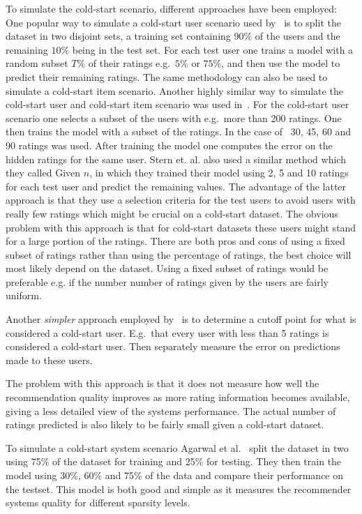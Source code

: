 To simulate the cold-start scenario, different approaches have been employed:
One popular way to simulate a cold-start user scenario used by~\cite{Stern2009,
Lam2008} is to split the dataset in two disjoint sets, a training set
containing $90\%$ of the users and the remaining $10\%$ being in the test set. For
each test user one trains a model with a random subset $T\%$ of their ratings
e.g.\ $5\%$ or $75\%$, and then use the model to predict their remaining
ratings. The same methodology can also be used to simulate a cold-start item
scenario. Another highly similar way to simulate the cold-start user and
cold-start item scenario was used in~\cite{Rashid2002, Rashid2008}. For the
cold-start user scenario one selects a subset of the users with e.g.\ more than
200 ratings. One then trains the model with a subset of the ratings. In the
case of~\cite{Rashid2002} 30, 45, 60 and 90 ratings was used. After training
the model one computes the error on the hidden ratings for the same user.
Stern et. al. \cite{Stern1998} also used a similar method which they called
Given $n$, in which they trained their model using 2, 5 and 10 ratings for each
test user and predict the remaining values.
The advantage of the latter approach is that they use a selection criteria for
the test users to avoid users with really few ratings which might be crucial on
a cold-start dataset. The obvious problem with this approach is that for
cold-start datasets these users might stand for a large portion of the ratings.
There are both pros and cons of using a fixed subset of ratings rather than
using the percentage of ratings, the best choice will most likely depend on the
dataset. Using a fixed subset of ratings would be preferable e.g. if the number
number of ratings given by the users are fairly uniform.

Another \emph{simpler} approach employed by~\cite{Massa2007, Jamali2009} is to
determine a cutoff point for what is considered a cold-start user. E.g.\ that
every user with less than 5 ratings is considered a cold-start user. Then
separately measure the error on predictions made to these users.

The problem with this approach is that it does not measure how well the
recommendation quality improves as more rating information becomes available,
giving a less detailed view of the systems performance. The actual number of
ratings predicted is also likely to be fairly small given a cold-start dataset.

To simulate a cold-start system scenario Agarwal et al.~\cite{Agarwal2009}
split the dataset in two using 75\% of the dataset for training and 25\% for
testing. They then train the model using 30\%, 60\% and 75\% of the data and
compare their performance on the testset. This model is both good and simple
as it measures the recommender systems quality for different sparsity levels.

